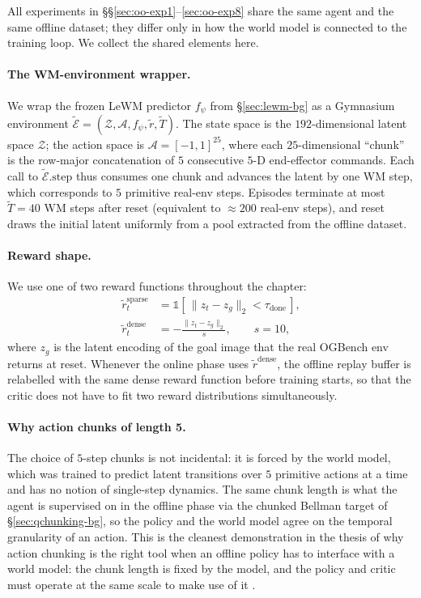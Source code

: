 All experiments in \S\S\ref{sec:oo-exp1}--\ref{sec:oo-exp8} share the same agent and the same offline dataset; they differ only in how the world model is connected to the training loop. We collect the shared elements here.

\paragraph{The WM-environment wrapper.} We wrap the frozen LeWM predictor $f_\psi$ from \S\ref{sec:lewm-bg} as a Gymnasium environment $\widetilde{\mathcal{E}} = (\mathcal{Z}, \mathcal{A}, f_\psi, \tilde r, \tilde T)$. The state space is the $192$-dimensional latent space $\mathcal{Z}$; the action space is $\mathcal{A} = [-1, 1]^{25}$, where each $25$-dimensional ``chunk'' is the row-major concatenation of $5$ consecutive $5$-D end-effector commands. Each call to $\widetilde{\mathcal{E}}.\text{step}$ thus consumes one chunk and advances the latent by one WM step, which corresponds to $5$ primitive real-env steps. Episodes terminate at most $\tilde T = 40$ WM steps after reset (equivalent to $\approx 200$ real-env steps), and reset draws the initial latent uniformly from a pool extracted from the offline dataset.

\paragraph{Reward shape.} We use one of two reward functions throughout the chapter:
\begin{align}
    \tilde r_t^{\text{sparse}} &= \mathbb{1}\!\left[\,\|z_t - z_g\|_2 < \tau_{\text{done}}\,\right], \\
    \tilde r_t^{\text{dense}}  &= -\frac{\|z_t - z_g\|_2}{s}, \qquad s = 10,
\end{align}
where $z_g$ is the latent encoding of the goal image that the real OGBench env returns at reset. Whenever the online phase uses $\tilde r^{\text{dense}}$, the offline replay buffer is relabelled with the same dense reward function before training starts, so that the critic does not have to fit two reward distributions simultaneously.

\paragraph{Why action chunks of length 5.} The choice of $5$-step chunks is not incidental: it is forced by the world model, which was trained to predict latent transitions over $5$ primitive actions at a time and has no notion of single-step dynamics. The same chunk length is what the agent is supervised on in the offline phase via the chunked Bellman target of \S\ref{sec:qchunking-bg}, so the policy and the world model agree on the temporal granularity of an action. This is the cleanest demonstration in the thesis of why action chunking is the right tool when an offline policy has to interface with a world model: the chunk length is fixed by the model, and the policy and critic must operate at the same scale to make use of it \cite{li2025reinforcement}.

